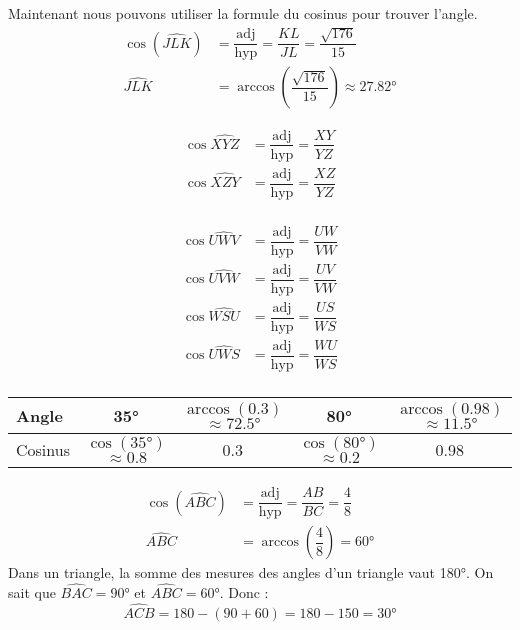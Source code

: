 \documentclass["../Cours.tex"]{subfiles}
\begin{document}
\begin{questions}
    Maintenant nous pouvons utiliser la formule du cosinus pour trouver l'angle.
    \begin{align*}
        \cos{(\widehat{JLK})} &= \dfrac{\mbox{adj}}{\mbox{hyp}} = \dfrac{KL}{JL} = \dfrac{\sqrt{176}}{15}\\
        \widehat{JLK} &= \arccos{\left(\dfrac{\sqrt{176}}{15}\right)} \approx \ang{27.82}
    \end{align*}


    \exercice 
    \begin{align*}
        \cos{\widehat{XYZ}} &= \dfrac{\mbox{adj}}{\mbox{hyp}} = \dfrac{XY}{YZ} \\
        \cos{\widehat{XZY}} &= \dfrac{\mbox{adj}}{\mbox{hyp}} = \dfrac{XZ}{YZ} \\
    \end{align*}

    \exercice 
    \begin{align*}
        \cos{\widehat{UWV}} &= \dfrac{\mbox{adj}}{\mbox{hyp}} = \dfrac{UW}{VW} \\
        \cos{\widehat{UVW}} &= \dfrac{\mbox{adj}}{\mbox{hyp}} = \dfrac{UV}{VW} \\
        \cos{\widehat{WSU}} &= \dfrac{\mbox{adj}}{\mbox{hyp}} = \dfrac{US}{WS} \\
        \cos{\widehat{UWS}} &= \dfrac{\mbox{adj}}{\mbox{hyp}} = \dfrac{WU}{WS} \\
    \end{align*}

    \exercice 
    \begin{center}
    \begin{tabularx}{0.9\linewidth}{|l|C|C|C|C|}\hline 
        Angle 
        & \ang{35} 
        &  
        & \ang{80} 
        &  \\\hline
        Cosinus 
        &  
        & \num{0.3} 
        &  
        & \num{0.98} \\\hline
    \end{tabularx}
    \end{center}

    \exercice 
    \question
    \begin{align*}
        \cos{(\widehat{ABC})} &= \dfrac{\mbox{adj}}{\mbox{hyp}} = \dfrac{AB}{BC} = \dfrac{4}{8}\\
        \widehat{ABC} &= \arccos{\left(\dfrac{4}{8}\right)} = \ang{60}
    \end{align*}
    \question 
    Dans un triangle, la somme des mesures des angles d'un triangle vaut \ang{180}. On sait que $\widehat{BAC}=\ang{90}$ et $\widehat{ABC}=\ang{60}$. Donc :
    \[ \widehat{ACB} = 180 - (90 + 60) = 180 - 150 = \ang{30} \]

    \exercice 
    
\end{questions}
\end{document}

